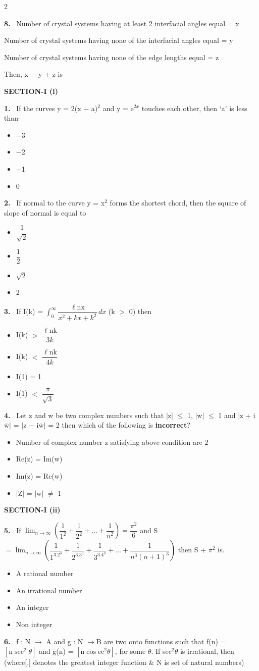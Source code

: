 \documentclass[10pt]{extarticle}
\newcommand{\papersec}[1]{\par\bigskip{\centering\Large\bfseries PAPER-#1\par}\medskip}
\newcommand{\partsec}[2]{\par\medskip\noindent{\large\bfseries PART-#1: #2}\par\smallskip}
\newcommand{\sect}[1]{\par\smallskip\noindent\textbf{#1}\par}
\newcommand{\qn}[1]{\par\smallskip\noindent\textbf{#1.}~}
\newenvironment{qoptions}{\begin{itemize}[leftmargin=1.8em,itemsep=1pt,topsep=2pt,label={}]}{\end{itemize}}
\newcommand{\opt}[2]{\item[(#1)] #2}
\begin{document}
\begin{multicols}{2}
\qn{8} Number of crystal systems having at least 2 interfacial angles equal = x\par
Number of crystal systems having none of the interfacial angles equal = y\par
Number of crystal systems having none of the edge lengths equal = z\par
Then, x $-$ y + z is\underline{\hspace{1cm}}
\raggedcolumns
\papersec{2}
\partsec{3}{MATHEMATICS}
\sect{SECTION-I (i)}
\qn{1} If the curves y = 2(x $-$ a)$^2$ and y = e$^{2x}$ touches each other, then `a' is less than-
\begin{qoptions}
\opt{A}{$-$3}
\opt{B}{$-$2}
\opt{C}{$-$1}
\opt{D}{0}
\end{qoptions}
\qn{2} If normal to the curve y = x$^2$ forms the shortest chord, then the square of slope of normal is equal to
\begin{qoptions}
\opt{A}{$\dfrac1{\sqrt2}$}
\opt{B}{$\dfrac12$}
\opt{C}{$\sqrt2$}
\opt{D}{2}
\end{qoptions}
\qn{3} If I(k) = $\displaystyle\int_0^\infty\dfrac{\ell\mathrm{nx}}{x^2+kx+k^2}\,dx$ (k $>$ 0) then
\begin{qoptions}
\opt{A}{I(k) $>$ $\dfrac{\ell\mathrm{nk}}{3k}$}
\opt{B}{I(k) $<$ $\dfrac{\ell\mathrm{nk}}{4k}$}
\opt{C}{I(1) = 1}
\opt{D}{I(1) $<$ $\dfrac\pi{\sqrt3}$}
\end{qoptions}
\qn{4} Let z and w be two complex numbers such that $|$z$|$ $\le$ 1, $|$w$|$ $\le$ 1 and $|$z + i$\bar{\mathrm w}|$ = $|$z $-$ i$\bar{\mathrm w}|$ = 2 then which of the following is \textbf{incorrect}?
\begin{qoptions}
\opt{A}{Number of complex number z satisfying above condition are 2}
\opt{B}{Re(z) = Im(w)}
\opt{C}{Im(z) = Re(w)}
\opt{D}{$|$Z$|$ = $|$w$|$ $\ne$ 1}
\end{qoptions}
\sect{SECTION-I (ii)}
\qn{5} If $\displaystyle\lim_{n\to\infty}\left(\dfrac1{1^2}+\dfrac1{2^2}+\ldots+\dfrac1{n^2}\right)=\dfrac{\pi^2}6$ and S $=\displaystyle\lim_{n\to\infty}\left(\dfrac1{1^3.2^3}+\dfrac1{2^3.3^3}+\dfrac1{3^3.4^3}+\ldots+\dfrac1{n^3(n+1)^3}\right)$ then S + $\pi^2$ is.
\begin{qoptions}
\opt{A}{A rational number}
\opt{B}{An irrational number}
\opt{C}{An integer}
\opt{D}{Non integer}
\end{qoptions}
\qn{6} f : N $\rightarrow$ A and g : N $\rightarrow$B are two onto functions such that f(n) = $\left[\mathrm n\sec^2\theta\right]$ and g(n) = $\left[\mathrm n\cos\mathrm{ec}^2\theta\right]$, for some $\theta$. If sec$^2\theta$ is irrational, then (where[.] denotes the greatest integer function \& N is set of natural numbers)

\end{multicols}
\end{document}
